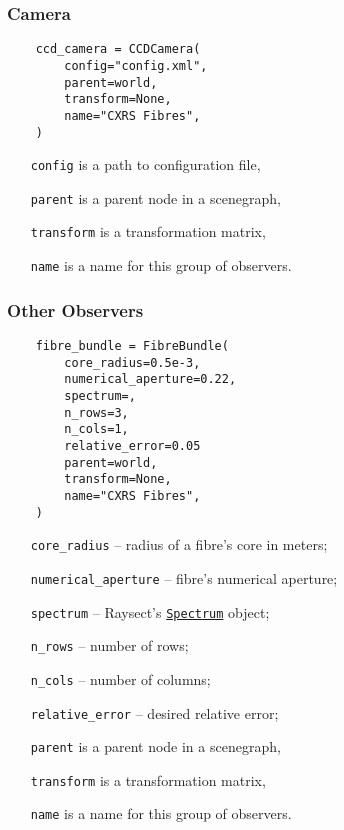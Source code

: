 \documentclass[../../main]{subfiles}
\begin{document}
\subsubsection{Camera}%
\label{sec:camera}

\begin{verbatim}
    ccd_camera = CCDCamera(
        config="config.xml",
        parent=world,
        transform=None,
        name="CXRS Fibres",
    )
\end{verbatim}

\begin{itemize}[align=left]
    \item[\texttt{config}] is a path to configuration file,
    \item[\texttt{parent}] is a parent node in a scenegraph,
    \item[\texttt{transform}] is a transformation matrix,
    \item[\texttt{name}] is a name for this group of observers.
\end{itemize}

\subsubsection{Other Observers}%
\label{sec:other_observers}

\begin{verbatim}
    fibre_bundle = FibreBundle(
        core_radius=0.5e-3,
        numerical_aperture=0.22,
        spectrum=,
        n_rows=3,
        n_cols=1,
        relative_error=0.05
        parent=world,
        transform=None,
        name="CXRS Fibres",
    )
\end{verbatim}

\begin{itemize}[align=left]
    \item[\texttt{core\_radius}] -- radius of a fibre's core in meters;
    \item[\texttt{numerical\_aperture}] -- fibre's numerical aperture;
    \item[\texttt{spectrum}] -- Raysect's \href{https://raysect.github.io/documentation/api_reference/optical/main_optical_classes.html?highlight=spectrum#raysect.optical.spectrum.Spectrum}{\texttt{Spectrum}} object;
    \item[\texttt{n\_rows}] -- number of rows;
    \item[\texttt{n\_cols}] -- number of columns;
    \item[\texttt{relative\_error}] -- desired relative error;
    \item[\texttt{parent}] is a parent node in a scenegraph,
    \item[\texttt{transform}] is a transformation matrix,
    \item[\texttt{name}] is a name for this group of observers.
\end{itemize}
\end{document}
